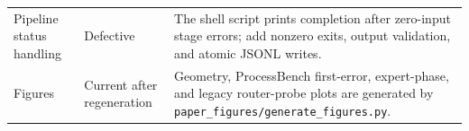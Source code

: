 \documentclass[manuscript,screen,review]{jair}
\begin{document}
\begin{table}[h]
\begin{tabular}{p{}p{}p{}}
Pipeline status handling & Defective & The shell script prints completion after zero-input stage errors; add nonzero exits, output validation, and atomic JSONL writes. \\
Figures & Current after regeneration & Geometry, ProcessBench first-error, expert-phase, and legacy router-probe plots are generated by \texttt{paper\_figures/generate\_figures.py}. \\
\bottomrule
\end{tabular}
\end{table}
\end{document}
